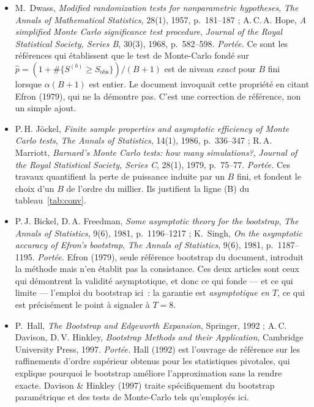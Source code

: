 \documentclass[a4paper,11pt]{article}
\begin{document}
\begin{itemize}[itemsep=4pt]
  \item M.~Dwass, \emph{Modified randomization tests for nonparametric
  hypotheses}, \emph{The Annals of Mathematical Statistics}, 28(1), 1957,
  p.~181--187 ; A.\,C.\,A. Hope, \emph{A simplified Monte Carlo significance
  test procedure}, \emph{Journal of the Royal Statistical Society, Series B},
  30(3), 1968, p.~582--598.
  \emph{Portée.} Ce sont les références qui établissent que le test
  de Monte-Carlo fondé sur $\hat p = (1 + \#\{S^{(b)} \ge S_{\text{obs}}\})/(B+1)$
  est de niveau \emph{exact} pour $B$ fini lorsque $\alpha(B+1)$ est entier. Le
  document invoquait cette propriété en citant Efron (1979), qui ne la
  démontre pas. C'est une correction de référence, non un simple ajout.

  \item P.\,H. Jöckel, \emph{Finite sample properties and asymptotic efficiency
  of Monte Carlo tests}, \emph{The Annals of Statistics}, 14(1), 1986,
  p.~336--347 ; R.\,A. Marriott, \emph{Barnard's Monte Carlo tests: how many
  simulations?}, \emph{Journal of the Royal Statistical Society, Series C},
  28(1), 1979, p.~75--77.
  \emph{Portée.} Ces travaux quantifient la perte de puissance
  induite par un $B$ fini, et fondent le choix d'un $B$ de l'ordre du millier.
  Ils justifient la ligne (B) du tableau~\ref{tab:conv}.

  \item P.\,J. Bickel, D.\,A. Freedman, \emph{Some asymptotic theory for the
  bootstrap}, \emph{The Annals of Statistics}, 9(6), 1981, p.~1196--1217 ;
  K.~Singh, \emph{On the asymptotic accuracy of Efron's bootstrap},
  \emph{The Annals of Statistics}, 9(6), 1981, p.~1187--1195.
  \emph{Portée.} Efron (1979), seule référence bootstrap du
  document, introduit la méthode mais n'en établit pas la consistance. Ces deux
  articles sont ceux qui démontrent la validité asymptotique, et donc ce qui
  fonde --- et ce qui limite --- l'emploi du bootstrap ici~: la garantie est
  \emph{asymptotique en $T$}, ce qui est précisément le point à signaler à
  $T = 8$.

  \item P.~Hall, \emph{The Bootstrap and Edgeworth Expansion}, Springer, 1992 ;
  A.\,C. Davison, D.\,V. Hinkley, \emph{Bootstrap Methods and their
  Application}, Cambridge University Press, 1997.
  \emph{Portée.} Hall (1992) est l'ouvrage de référence sur les
  raffinements d'ordre supérieur obtenus pour les statistiques pivotales, qui
  explique pourquoi le bootstrap améliore l'approximation sans la rendre exacte.
  Davison \& Hinkley (1997) traite spécifiquement du bootstrap paramétrique et
  des tests de Monte-Carlo tels qu'employés ici.
\end{itemize}
\end{document}
